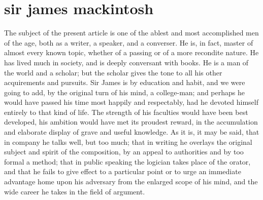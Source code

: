 \chapter[Sir James Mackintosh]{sir james mackintosh} %

The subject of the present article is one of the ablest and most
accomplished men of the age, both as a writer, a speaker, and a
converser. He is, in fact, master of almost every known topic,
whether of a passing or of a more recondite nature. He has lived
much in society, and is deeply conversant with books. He is a man
of the world and a scholar; but the scholar gives the tone to all
his other acquirements and pursuits. Sir James is by education and
habit, and we were going to add, by the original turn of his mind,
a college-man; and perhaps he would have passed his time most
happily and respectably, had he devoted himself entirely to that
kind of life. The strength of his faculties would have been best
developed, his ambition would have met its proudest reward, in the
accumulation and elaborate display of grave and useful
knowledge. As it is, it may be said, that in company he talks
well, but too much; that in writing he overlays the original
subject and spirit of the composition, by an appeal to authorities
and by too formal a method; that in public speaking the logician
takes place of the orator, and that he fails to give effect to a
particular point or to urge an immediate advantage home upon his
adversary from the enlarged scope of his mind, and the wide career
he takes in the field of argument.

